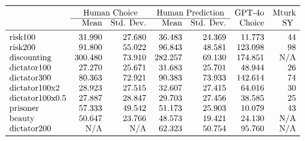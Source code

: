 

\[
\begin{array}{lrrrrrr}
\toprule
 & \multicolumn{2}{c}{\text{Human Choice}} & \multicolumn{2}{c}{\text{Human Prediction}} & \text{GPT-4o} & \text{Mturk} \\
 \cline{2-3}  \cline{4-5}
 & \text{Mean} & \text{Std. Dev.} & \text{Mean} & \text{Std. Dev.} & \text{Choice} & \text{SY } \\
\midrule
\text{risk100} & 31.990 & 27.680 & 36.483 & 24.369 & 11.773 & 44\\
\text{risk200} & 91.800 & 55.022 & 96.843 & 48.581 & 123.098 & 98\\
\text{discounting} & 300.480 & 73.910 & 282.257 & 69.130 & 174.851 & \text{N/A} \\
\text{dictator100} & 27.270 & 25.671 & 31.683 & 25.701 & 48.944 & 26\\
\text{dictator300} & 80.363 & 72.921 & 90.383 & 73.933 & 142.614 & 74\\
\text{dictator100x2} & 28.923 & 27.515 & 32.607 & 27.415 & 64.016 & 30\\
\text{dictator100x0.5} & 27.887 & 28.847 & 29.703 & 27.456 & 38.585 & 25 \\
\text{prisoner} & 57.333 & 49.542 & 51.173 & 25.903 & 10.079 & 43 \\
\text{beauty} & 50.647 & 23.766 & 48.573 & 19.421 & 24.130 & \text{N/A}\\
\text{dictator200} & \text{N/A} & \text{N/A} & 62.323 & 50.754 & 95.760 & \text{N/A}\\
\bottomrule
\end{array}
\]


